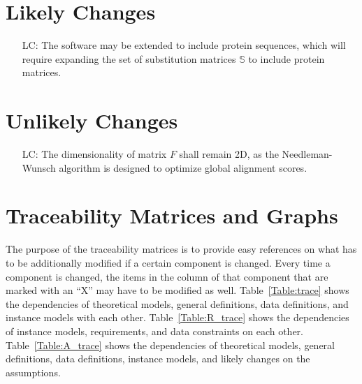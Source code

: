 \documentclass[12pt]{article}
\newcounter{lcnum} %
\begin{document}
\section{Likely Changes}    

\noindent \begin{itemize}

\item[LC\refstepcounter{lcnum}\thelcnum\label{LC_expand_matrices}:]
The software may be extended to include protein sequences, which will require
expanding the set of substitution matrices $\mathbb{S}$ to include protein matrices.

\end{itemize}

\section{Unlikely Changes}    

\noindent \begin{itemize}

\item[LC\refstepcounter{lcnum}\thelcnum\label{LC_keep_optimization_global}:] 
The dimensionality of matrix $F$ shall remain 2D, as the Needleman-Wunsch algorithm
is designed to optimize global alignment scores.

\end{itemize}

\section{Traceability Matrices and Graphs}

The purpose of the traceability matrices is to provide easy references on what
has to be additionally modified if a certain component is changed.  Every time a
component is changed, the items in the column of that component that are marked
with an ``X'' may have to be modified as well.  Table~\ref{Table:trace} shows the
dependencies of theoretical models, general definitions, data definitions, and
instance models with each other. Table~\ref{Table:R_trace} shows the
dependencies of instance models, requirements, and data constraints on each
other. Table~\ref{Table:A_trace} shows the dependencies of theoretical models,
general definitions, data definitions, instance models, and likely changes on
the assumptions.


\end{document}

